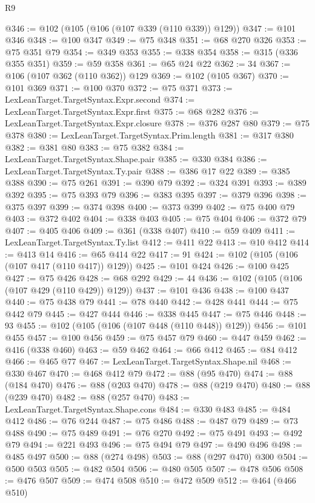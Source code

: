 \begin{lexlean}{R9}
\begin{coremodule}
@346 := @102 (@105 (@106 (@107 @339 (@110 @339)) @129))
@347 := @101 @346
@348 := @100 @347
@349 := @75 @348
@351 := @68 @270 @326
@353 := @75 @351 @79
@354 := @349 @353
@355 := @338 @354
@358 := @315 (@336 @355 @351)
@359 := @59 @358
@361 := @65 @24 @22
@362 := 34
@367 := @106 (@107 @362 (@110 @362)) @129
@369 := @102 (@105 @367)
@370 := @101 @369
@371 := @100 @370
@372 := @75 @371
@373 := LexLeanTarget.TargetSyntax.Expr.second
@374 := LexLeanTarget.TargetSyntax.Expr.first
@375 := @68 @282
@376 := LexLeanTarget.TargetSyntax.Expr.closure
@378 := @376 @287 @80
@379 := @75 @378
@380 := LexLeanTarget.TargetSyntax.Prim.length
@381 := @317 @380
@382 := @381 @80
@383 := @75 @382
@384 := LexLeanTarget.TargetSyntax.Shape.pair
@385 := @330 @384
@386 := LexLeanTarget.TargetSyntax.Ty.pair
@388 := @386 @17 @22
@389 := @385 @388
@390 := @75 @261
@391 := @390 @79
@392 := @324 @391
@393 := @389 @392
@395 := @75 @393 @79
@396 := @383 @395
@397 := @379 @396
@398 := @375 @397
@399 := @374 @398
@400 := @373 @399
@402 := @75 @400 @79
@403 := @372 @402
@404 := @338 @403
@405 := @75 @404
@406 := @372 @79
@407 := @405 @406
@409 := @361 (@338 @407)
@410 := @59 @409
@411 := LexLeanTarget.TargetSyntax.Ty.list
@412 := @411 @22
@413 := @10 @412
@414 := @413 @14
@416 := @65 @414 @22
@417 := 91
@424 := @102 (@105 (@106 (@107 @417 (@110 @417)) @129))
@425 := @101 @424
@426 := @100 @425
@427 := @75 @426
@428 := @68 @292
@429 := 44
@436 := @102 (@105 (@106 (@107 @429 (@110 @429)) @129))
@437 := @101 @436
@438 := @100 @437
@440 := @75 @438 @79
@441 := @78 @440
@442 := @428 @441
@444 := @75 @442 @79
@445 := @427 @444
@446 := @338 @445
@447 := @75 @446
@448 := 93
@455 := @102 (@105 (@106 (@107 @448 (@110 @448)) @129))
@456 := @101 @455
@457 := @100 @456
@459 := @75 @457 @79
@460 := @447 @459
@462 := @416 (@338 @460)
@463 := @59 @462
@464 := @66 @412
@465 := @84 @412
@466 := @465 @77
@467 := LexLeanTarget.TargetSyntax.Shape.nil
@468 := @330 @467
@470 := @468 @412 @79
@472 := @88 (@95 @470)
@474 := @88 (@184 @470)
@476 := @88 (@203 @470)
@478 := @88 (@219 @470)
@480 := @88 (@239 @470)
@482 := @88 (@257 @470)
@483 := LexLeanTarget.TargetSyntax.Shape.cons
@484 := @330 @483
@485 := @484 @412
@486 := @76 @244
@487 := @75 @486
@488 := @487 @79
@489 := @73 @488
@490 := @75 @489
@491 := @76 @270
@492 := @75 @491
@493 := @492 @79
@494 := @221 @493
@496 := @75 @494 @79
@497 := @490 @496
@498 := @485 @497
@500 := @88 (@274 @498)
@503 := @88 (@297 @470) @300
@504 := @500 @503
@505 := @482 @504
@506 := @480 @505
@507 := @478 @506
@508 := @476 @507
@509 := @474 @508
@510 := @472 @509
@512 := @464 (@466 @510)

\end{coremodule}
\end{lexlean}
